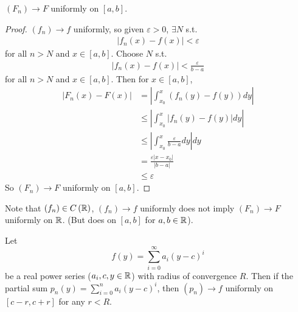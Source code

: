 \documentclass[a4paper]{article}
\begin{document}
\begin{prop}
$\left(F_n\right) \to F$ uniformly on $\left[a,b\right]$.
\begin{proof}
$\left(f_n\right) \to f$ uniformly, so given $\varepsilon>0$, $\exists N$ s.t.
\begin{equation*}
\begin{aligned}
\left|f_n\left(x\right) - f\left(x\right) \right| < \varepsilon
\end{aligned}
\end{equation*}
for all $n>N$ and $x \in \left[a,b\right]$.
Choose $N$ s.t.
\begin{equation*}
\begin{aligned}
\left|f_n\left(x\right) - f\left(x\right) \right| < \frac{\varepsilon}{b-a}
\end{aligned}
\end{equation*}
for all $n>N$ and $x \in \left[a,b\right]$. Then for $x \in \left[a,b\right]$,
\begin{equation*}
\begin{aligned}
\left|F_n\left(x\right) - F\left(x\right)\right| &= \left|\int_{x_0}^x \left(f_n\left(y\right) - f\left(y\right)\right) dy\right|\\
&\leq \left|\int_{x_0}^x \left|f_n\left(y\right)-f\left(y\right)\right|dy\right|\\
&\leq \left| \int_{x_0}^x \frac{\varepsilon}{b-a} dy\right| dy\\
&= \frac{\varepsilon \left|x-x_0\right|}{\left|b-a\right|}\\
&\leq \varepsilon
\end{aligned}
\end{equation*}
So $\left(F_n\right) \to F$ uniformly on $\left[a,b\right]$.
\end{proof}
\end{prop}

Note that $\left(f_n\right) \in C\left(\mathbb{R}\right)$, $\left(f_n\right) \to f$ uniformly does not imply $\left(F_n\right) \to F$ uniformly on $\mathbb{R}$. (But does on $\left[a,b\right]$ for $a,b\in \mathbb{R}$).

Let $$f\left(y\right) = \sum_{i=0}^\infty a_i \left(y-c\right)^i$$ be a real power series ($a_i,c,y \in \mathbb{R}$) with radius of convergence $R$. Then if the partial sum $p_n\left(y\right) = \sum_{i=0}^n a_i\left(y-c\right)^i$, then $\left(p_n\right) \to f$ uniformly on $\left[c-r,c+r\right]$ for any $r<R$.
\end{document}
